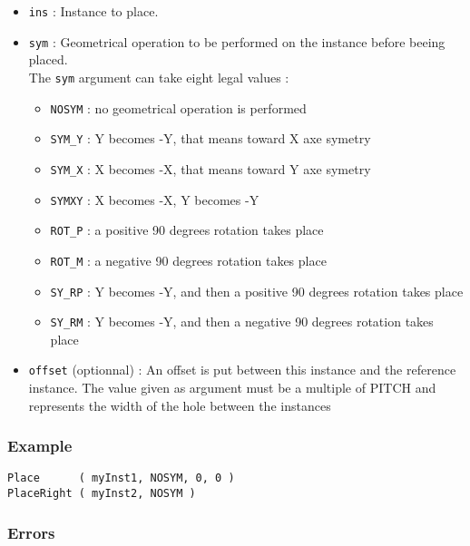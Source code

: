 \begin{itemize}
    \item \verb-ins- : Instance to place.
    \item \verb-sym- : Geometrical operation to be performed on the instance before beeing placed.\\The \verb-sym- argument can take eight legal values :
    \begin{itemize}
        \item \verb-NOSYM- : no geometrical operation is performed
        \item \verb-SYM_Y- : Y becomes -Y, that means toward X axe symetry
        \item \verb-SYM_X- : X becomes -X, that means toward Y axe symetry
        \item \verb-SYMXY- : X becomes -X, Y becomes -Y
        \item \verb-ROT_P- : a positive 90 degrees rotation takes place
        \item \verb-ROT_M- : a negative 90 degrees rotation takes place
        \item \verb-SY_RP- : Y becomes -Y, and then a positive 90 degrees rotation takes place
        \item \verb-SY_RM- : Y becomes -Y, and then a negative 90 degrees rotation takes place
    \end{itemize}
    \item \verb-offset- (optionnal) : An offset is put between this instance and the reference instance. The value given as argument must be a multiple of PITCH and represents the width of the hole between the instances
\end{itemize}

\subsubsection{Example}

\begin{verbatim}
Place      ( myInst1, NOSYM, 0, 0 )
PlaceRight ( myInst2, NOSYM )
\end{verbatim}

\subsubsection{Errors}
    
